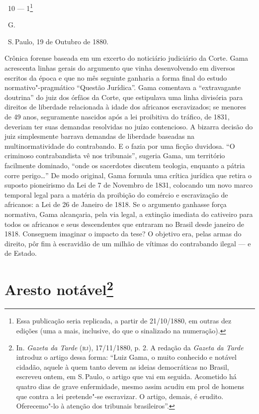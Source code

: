 \hfill\ 10 --- 1\footnote{Essa publicação seria replicada, a partir de
  21/10/1880, em outras dez edições (uma a mais, inclusive, do que o
  sinalizado na numeração).}\smallskip

\vfill

\hfill\ G.

\hfill\ S.\,Paulo, 19 de Outubro de 1880.

\pagebreak
\mbox{}\vfill
\thispagestyle{empty}

{\small\noindent
Crônica forense baseada em um
excerto do noticiário judiciário da Corte. Gama acrescenta linhas gerais
do argumento que vinha desenvolvendo em diversos escritos da época e que
no mês seguinte ganharia a forma final do estudo normativo"-pragmático
``Questão Jurídica''. Gama comentava a ``extravagante doutrina'' do juiz dos
órfãos da Corte, que estipulava uma linha divisória para direitos de
liberdade relacionada à idade dos africanos escravizados; se menores de
49 anos, seguramente nascidos após a lei proibitiva do tráfico, de 1831,
deveriam ter suas demandas resolvidas no juízo contencioso. A bizarra
decisão do juiz simplesmente barrava demandas de liberdade baseadas na
multinormatividade do contrabando. E o fazia por uma ficção duvidosa. ``O
criminoso contrabandista vê nos tribunais'', sugeria Gama, um território
facilmente dominado, ``onde os sacerdotes discutem teologia, enquanto a
pátria corre perigo\ldots{}'' De modo original, Gama formula uma crítica
jurídica que retira o suposto pioneirismo da Lei de 7 de Novembro de
1831, colocando um novo marco temporal legal para a matéria da
proibição do comércio e escravização de africanos: a Lei de 26 de
Janeiro de 1818. Se o argumento ganhasse força normativa, Gama alcançaria, pela via
legal, a extinção imediata do cativeiro para todos os africanos e seus
descendentes que entraram no Brasil desde janeiro de 1818. Conseguem
imaginar o impacto da tese? O objetivo era, pelas armas do direito, pôr
fim à escravidão de um milhão de vítimas do contrabando ilegal --- e de
Estado. }

\chapter{Aresto notável\footnote[*]{In. \emph{Gazeta da Tarde} (\textsc{rj}),
  17/11/1880, p. 2. A redação da \emph{Gazeta da Tarde} introduz o
  artigo dessa forma: ``Luiz Gama, o muito conhecido e notável cidadão,
  aquele à quem tanto devem as ideias democráticas no Brasil, escreveu
  ontem, em S.\,Paulo, o artigo que vai em seguida. Acometido há quatro
  dias de grave enfermidade, mesmo assim acudiu em prol de homens que
  contra a lei pretende"-se escravizar. O artigo, demais, é erudito.
  Oferecemo"-lo à atenção dos tribunais brasileiros''.}}


